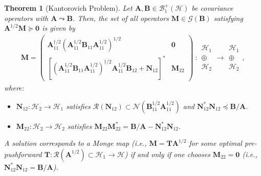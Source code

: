 \documentclass[noinfoline]{imsart}\setcounter{tocdepth}{2}
\newcommand{\m}[1]{\mathbf{#1}} %
\newcommand{\s}[1]{\mathscr{#1}} %
\renewcommand{\c}[1]{\mathcal{#1}} %
\theoremstyle{plain}
\newtheorem{theorem}{Theorem}[section]
\begin{document}
\begin{theorem}[Kantorovich Problem]\label{thm:Kanto:char:inf}
Let $\m{A}, \m{B} \in \c{B}_{1}^{+}(\c{H})$ be covariance operators with $\m{A} \leadsto \m{B}$. Then, the set of all operators $\m{M} \in \s{G}(\m{B})$ satisfying $\m{A}^{1/2} \m{M} \succeq \m{0}$ is given by
\begin{align*}
    \m{M} =
    \begin{pmatrix}
    \m{A}_{11}^{\dagger/2} (\m{A}_{11}^{1/2} \m{B}_{11} \m{A}_{11}^{1/2})^{1/2} & \m{0} \\
    [(\m{A}_{11}^{1/2} \m{B}_{11} \m{A}_{11}^{1/2})^{\dagger/2} \m{A}_{11}^{1/2} \m{B}_{12} + \m{N}_{12}]^{*} & \m{M}_{22}
    \end{pmatrix}
    \    :
    \begin{array}{c}
    \c{H}_{1} \\
    \oplus \\
    \c{H}_{2}
    \end{array}
    \rightarrow
    \begin{array}{c}
    \c{H}_{1} \\
    \oplus \\
    \c{H}_{2}
    \end{array} ,
\end{align*}
where: 
\begin{itemize}[leftmargin = *]
    \item $\m{N}_{12}  : \c{H}_{2} \to \c{H}_{1}$ satisfies $\c{R}(\m{N}_{12}) \subset \c{N}(\m{B}_{11}^{1/2} \m{A}_{11}^{1/2})$ and $\m{N}_{12}^{*} \m{N}_{12} \preceq \m{B}/\m{A}$.
    \item $\m{M}_{22}  : \c{H}_{2} \to \c{H}_{2}$ satisfies $\m{M}_{22} \m{M}_{22}^{*} = \m{B}/\m{A} - \m{N}_{12}^{*} \m{N}_{12}$.
\end{itemize}
A solution corresponds to a Monge map (i.e., $\m{M} = \m{T}\m{A}^{1/2}$ for some optimal pre-pushforward $\m{T}: \c{R}(\m{A}^{1/2}) \subset \c{H}_{1} \rightarrow \c{H}$) if and only if one chooses $\m{M}_{22} = \m{0}$ (i.e., $\m{N}_{12}^{*} \m{N}_{12} = \m{B}/\m{A}$).
\end{theorem}
\end{document}
